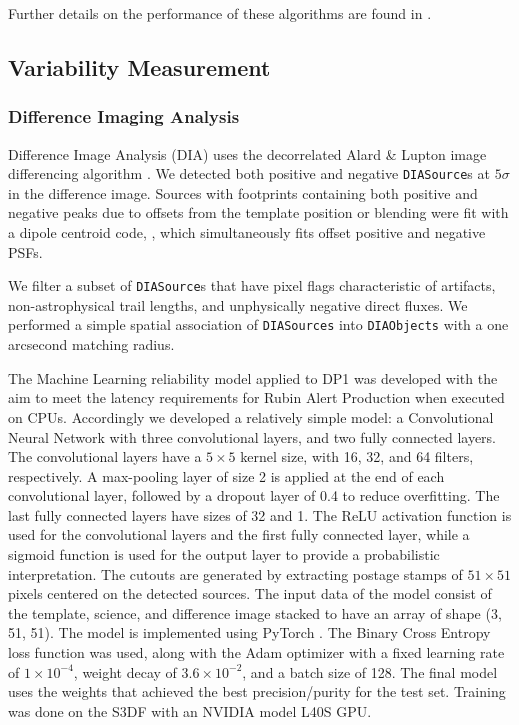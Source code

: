 Further details on the performance of these algorithms are found in .

\subsection{Variability Measurement}
\subsubsection{Difference Imaging Analysis}
\label{ssec:diffim_analysis}
Difference Image Analysis (DIA) uses the decorrelated Alard \& Lupton image differencing algorithm \citep{DMTN-021}.
We detected both positive and negative \texttt{DIASource}s at $5\sigma$ in the difference image.
Sources with footprints containing both positive and negative peaks due to offsets from the template position or blending were fit with a dipole centroid code, , which simultaneously fits offset positive and negative PSFs.

We filter a subset of \texttt{DIASource}s that have pixel flags characteristic of artifacts, non-astrophysical trail lengths, and unphysically negative direct fluxes.
We performed a simple spatial association of \texttt{DIASources} into \texttt{DIAObjects} with a one arcsecond matching radius.

The Machine Learning reliability model applied to DP1 was developed with the aim to meet the latency requirements for Rubin \gls{Alert Production} when executed on CPUs. Accordingly we developed a relatively simple model: a Convolutional Neural Network with three convolutional layers, and two fully connected layers.
The convolutional layers have a $5\times5$ kernel size, with 16, 32, and 64 filters, respectively.
A max-pooling layer of size 2 is applied at the end of each convolutional layer, followed by a dropout layer of 0.4 to reduce overfitting.
The last fully connected layers have sizes of 32 and 1.
The ReLU activation function is used for the convolutional layers and the first fully connected layer, while a sigmoid function is used for the output layer to provide a probabilistic interpretation.
The cutouts are generated by extracting postage stamps of $51\times51$ pixels centered on the detected sources.
The input data of the model consist of the template, science, and difference image stacked to have an array of \gls{shape} (3, 51, 51).
The model is implemented using PyTorch \citep{10.1145/3620665.3640366}.
The Binary Cross Entropy loss function was used, along with the \gls{Adam} optimizer with a fixed learning rate of $1\times10^{-4}$, weight decay of $3.6\times10^{-2}$, and a batch size of 128.
The final model uses the weights that achieved the best precision/purity for the test set.
Training was done on the \gls{S3DF} with an NVIDIA model L40S GPU.

